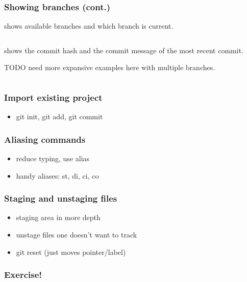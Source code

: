 \begin{frame}[fragile]
\frametitle{Showing branches (cont.)}
 shows available branches and which branch is
current.

    \inputminted{bash}{git-branch-output.txt}

 shows the commit hash and the commit
message of the most recent commit.

TODO need more expansive examples here with multiple branches.

    \inputminted{bash}{git-branch-v-output.txt}
\end{frame}

\begin{frame}
\frametitle{Import existing project}
\begin{itemize}
    \item git init, git add, git commit
\end{itemize}
\end{frame}

\begin{frame}
\frametitle{Aliasing commands}
\begin{itemize}
    \item reduce typing, use alias
    \item handy aliases: st, di, ci, co
\end{itemize}
\end{frame}

\begin{frame}
\frametitle{Staging and unstaging files}
\begin{itemize}
    \item staging area in more depth
    \item unstage files one doesn't want to track
    \item git reset (just moves pointer/label)
\end{itemize}
\end{frame}

\begin{frame}
\frametitle{Exercise!}
\end{frame}
